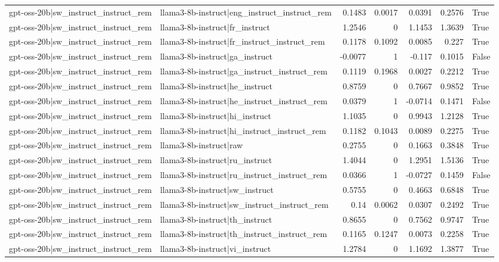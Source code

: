 \begin{table}
\begin{tabular}{l l r r r r l}
gpt-oss-20b|sw_instruct_instruct_rem & llama3-8b-instruct|eng_instruct_instruct_rem & 0.1483 & 0.0017 & 0.0391 & 0.2576 & True \\
gpt-oss-20b|sw_instruct_instruct_rem & llama3-8b-instruct|fr_instruct & 1.2546 & 0 & 1.1453 & 1.3639 & True \\
gpt-oss-20b|sw_instruct_instruct_rem & llama3-8b-instruct|fr_instruct_instruct_rem & 0.1178 & 0.1092 & 0.0085 & 0.227 & True \\
gpt-oss-20b|sw_instruct_instruct_rem & llama3-8b-instruct|ga_instruct & -0.0077 & 1 & -0.117 & 0.1015 & False \\
gpt-oss-20b|sw_instruct_instruct_rem & llama3-8b-instruct|ga_instruct_instruct_rem & 0.1119 & 0.1968 & 0.0027 & 0.2212 & True \\
gpt-oss-20b|sw_instruct_instruct_rem & llama3-8b-instruct|he_instruct & 0.8759 & 0 & 0.7667 & 0.9852 & True \\
gpt-oss-20b|sw_instruct_instruct_rem & llama3-8b-instruct|he_instruct_instruct_rem & 0.0379 & 1 & -0.0714 & 0.1471 & False \\
gpt-oss-20b|sw_instruct_instruct_rem & llama3-8b-instruct|hi_instruct & 1.1035 & 0 & 0.9943 & 1.2128 & True \\
gpt-oss-20b|sw_instruct_instruct_rem & llama3-8b-instruct|hi_instruct_instruct_rem & 0.1182 & 0.1043 & 0.0089 & 0.2275 & True \\
gpt-oss-20b|sw_instruct_instruct_rem & llama3-8b-instruct|raw & 0.2755 & 0 & 0.1663 & 0.3848 & True \\
gpt-oss-20b|sw_instruct_instruct_rem & llama3-8b-instruct|ru_instruct & 1.4044 & 0 & 1.2951 & 1.5136 & True \\
gpt-oss-20b|sw_instruct_instruct_rem & llama3-8b-instruct|ru_instruct_instruct_rem & 0.0366 & 1 & -0.0727 & 0.1459 & False \\
gpt-oss-20b|sw_instruct_instruct_rem & llama3-8b-instruct|sw_instruct & 0.5755 & 0 & 0.4663 & 0.6848 & True \\
gpt-oss-20b|sw_instruct_instruct_rem & llama3-8b-instruct|sw_instruct_instruct_rem & 0.14 & 0.0062 & 0.0307 & 0.2492 & True \\
gpt-oss-20b|sw_instruct_instruct_rem & llama3-8b-instruct|th_instruct & 0.8655 & 0 & 0.7562 & 0.9747 & True \\
gpt-oss-20b|sw_instruct_instruct_rem & llama3-8b-instruct|th_instruct_instruct_rem & 0.1165 & 0.1247 & 0.0073 & 0.2258 & True \\
gpt-oss-20b|sw_instruct_instruct_rem & llama3-8b-instruct|vi_instruct & 1.2784 & 0 & 1.1692 & 1.3877 & True \\

\end{tabular}
\end{table}
